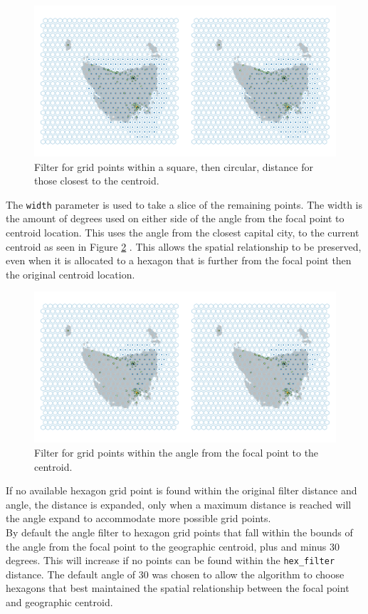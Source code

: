 \documentclass{monashthesis}
\begin{document}
\begin{figure}[H]
\centering
\includegraphics[width=14cm]{figures/03-algorithm/4grid.png}
\caption{\label{fig:buffers}Filter for grid points within a square, then circular, distance for those closest to the centroid.}
\end{figure}

The \texttt{width} parameter is used to take a slice of the remaining points. The width is the amount of degrees used on either side of the angle from the focal point to centroid location. This uses the angle from the closest capital city, to the current centroid as seen in Figure \ref{fig:angles} . This allows the spatial relationship to be preserved, even when it is allocated to a hexagon that is further from the focal point then the original centroid location.

\begin{figure}[H]
\centering
\includegraphics[width=14cm]{figures/03-algorithm/5allocate.png}
\caption{\label{fig:angles}Filter for grid points within the angle from the focal point to the centroid.}
\end{figure}

If no available hexagon grid point is found within the original filter distance and angle, the distance is expanded, only when a maximum distance is reached will the angle expand to accommodate more possible grid points.\\
By default the angle filter to hexagon grid points that fall within the bounds of the angle from the focal point to the geographic centroid, plus and minus 30 degrees. This will increase if no points can be found within the \texttt{hex\_filter} distance. The default angle of 30 was chosen to allow the algorithm to choose hexagons that best maintained the spatial relationship between the focal point and geographic centroid.
\end{document}
